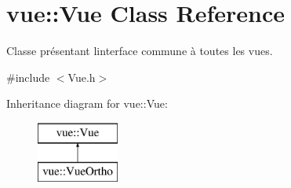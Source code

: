 \hypertarget{classvue_1_1_vue}{}\section{vue\+:\+:Vue Class Reference}
\label{classvue_1_1_vue}


Classe présentant l\textquotesingle{}interface commune à toutes les vues.  




{\ttfamily \#include $<$Vue.\+h$>$}

Inheritance diagram for vue\+:\+:Vue\+:\begin{figure}[H]
\begin{center}
\leavevmode
\includegraphics[height=2.000000cm]{classvue_1_1_vue}
\end{center}
\end{figure}
